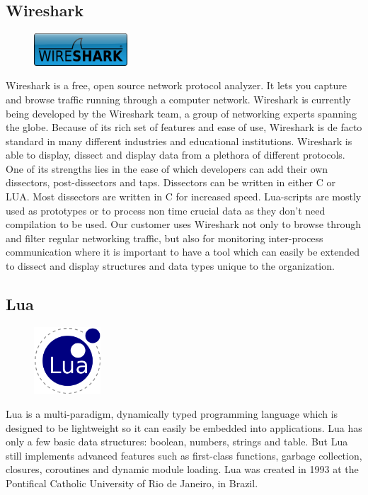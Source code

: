 \subsection{Wireshark}
\begin{figure}
	\begin{center}
	\vspace{-30pt}
		\includegraphics[width=3.5cm]{./planning/img/wireshark_logo}
	\vspace{-30pt}
	\end{center}
\end{figure}
Wireshark is a free, open source network protocol analyzer. It lets you capture
and browse traffic running through a computer network. Wireshark is currently
being developed by the Wireshark team, a group of networking experts spanning
the globe. Because of its rich set of features and ease of use, Wireshark is de
facto standard in many different industries and educational institutions.
Wireshark is able to display, dissect and display data from a plethora of
different protocols. One of its strengths lies in the ease of which developers
can add their own dissectors, post-dissectors and taps. Dissectors can be
written in either C or LUA. Most dissectors are written in C for increased
speed. Lua-scripts are mostly used as prototypes or to process non time crucial
data as they don’t need compilation to be used. Our customer uses Wireshark not
only to browse through and filter regular networking traffic, but also for
monitoring inter-process communication where it is important to have a tool
which can easily be extended to dissect and display structures and data types
unique to the organization.

\subsection{Lua}
\begin{figure}
	\begin{center}
	\vspace{-30pt}
		\includegraphics[width=2.5cm]{./planning/img/lua_logo}
	\vspace{-30pt}
	\end{center}
\end{figure}
Lua is a multi-paradigm, dynamically typed programming language which is
designed to be lightweight so it can easily be embedded into applications.
Lua has only a few basic data structures: boolean, numbers, strings and table.
But Lua still implements advanced features such as first-class functions,
garbage collection, closures, coroutines and dynamic module loading. Lua was
created in 1993 at the Pontifical Catholic University of Rio de Janeiro, in
Brazil.


